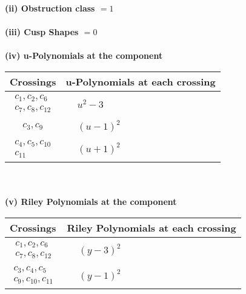 \documentclass[1p]{elsarticle_modified}
\theoremstyle{definition}
\begin{document}
\flushleft \textbf{(ii) Obstruction class $= 1$}\\~\\
\flushleft \textbf{(iii) Cusp Shapes $= 0$}\\~\\
\newpage\renewcommand{\arraystretch}{1}
\flushleft \textbf{(iv) u-Polynomials at the component}\newline \\
\begin{tabular}{m{50pt}|m{274pt}}
Crossings & \hspace{64pt}u-Polynomials at each crossing \\
\hline $$\begin{aligned}c_{1},c_{2},c_{6}\\c_{7},c_{8},c_{12}\end{aligned}$$&$\begin{aligned}
&u^2-3
\end{aligned}$\\
\hline $$\begin{aligned}c_{3},c_{9}\end{aligned}$$&$\begin{aligned}
&(u-1)^2
\end{aligned}$\\
\hline $$\begin{aligned}c_{4},c_{5},c_{10}\\c_{11}\end{aligned}$$&$\begin{aligned}
&(u+1)^2
\end{aligned}$\\
\hline
\end{tabular}\\~\\
\newpage\renewcommand{\arraystretch}{1}
\flushleft \textbf{(v) Riley Polynomials at the component}\newline \\
\begin{tabular}{m{50pt}|m{274pt}}
Crossings & \hspace{64pt}Riley Polynomials at each crossing \\
\hline $$\begin{aligned}c_{1},c_{2},c_{6}\\c_{7},c_{8},c_{12}\end{aligned}$$&$\begin{aligned}
&(y-3)^2
\end{aligned}$\\
\hline $$\begin{aligned}c_{3},c_{4},c_{5}\\c_{9},c_{10},c_{11}\end{aligned}$$&$\begin{aligned}
&(y-1)^2
\end{aligned}$\\
\hline
\end{tabular}\\~\\
\end{document}

